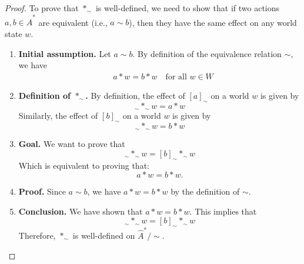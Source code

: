 \begin{proof}
    To prove that $\ast_{\sim}$ is well-defined, we need to show that if two actions $a, b \in \hat{A}^{\ast}$ are equivalent (i.e., $a \sim b$), then they have the same effect on any world state $w$.

    \begin{enumerate}[(1)]
        \item \textbf{Initial assumption.}
              Let $a \sim b$.
              By definition of the equivalence relation $\sim$, we have
              \begin{align}
                   & a \ast w = b \ast w \quad \text{for all } w \in W
              \end{align}

        \item \textbf{Definition of $\ast_{\sim}$.}
              By definition, the effect of $[a]_{\sim}$ on a world $w$ is given by
              \begin{equation}
                  [a]_{\sim} \ast_{\sim} w = a \ast w
              \end{equation}
              Similarly, the effect of $[b]_{\sim}$ on a world $w$ is given by
              \begin{equation}
                  [b]_{\sim} \ast_{\sim} w = b \ast w
              \end{equation}

        \item \textbf{Goal.}
              We want to prove that
              \begin{equation}
                  [a]_{\sim} \ast_{\sim} w = [b]_{\sim} \ast_{\sim} w
              \end{equation}
              Which is equivalent to proving that:
              \begin{equation}
                  a \ast w = b \ast w.
              \end{equation}

        \item \textbf{Proof.}
              Since $a \sim b$, we have $a \ast w = b \ast w$ by the definition of $\sim$.

        \item \textbf{Conclusion.}
              We have shown that $a \ast w = b \ast w$.
              This implies that
              \begin{equation}
                  [a]_{\sim} \ast_{\sim} w = [b]_{\sim} \ast_{\sim} w
              \end{equation}
              Therefore, $\ast_{\sim}$ is well-defined on $\hat{A}^{\ast}/\sim$.
    \end{enumerate}
\end{proof}

